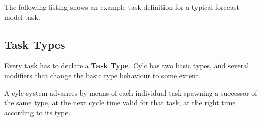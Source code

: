 \documentclass[11pt,a4paper]{article}
\begin{document}
The following listing shows an example task definition for a
typical forecast-model task.

\lstset{language=cylctaskdef}

{

}


\subsection{Task Types} 

Every task has to declare a {\bf Task Type}. Cylc has two basic types,
and several modifiers that change the basic type behaviour to some
extent.  

A cylc system advances by means of each individual task spawning a 
successor of the same type, at the next cycle time valid for that task,
at the right time according to its type.
\end{document}
